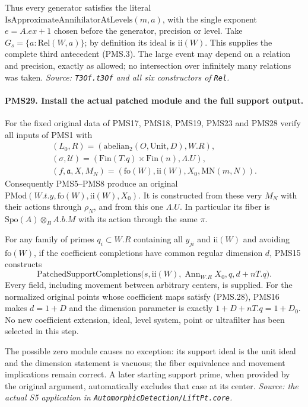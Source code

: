 Thus every generator satisfies the literal
$\mathrm{IsApproximateAnnihilatorAtLevels}(m,a)$, with the
single exponent $e=A.ex+1$ chosen before the generator,
precision or level.  Take $G_s=\{a:\mathrm{Rel}(W,a)\}$;
by definition its ideal is $\mathrm{ii}(W)$.
This supplies the complete third antecedent (PMS.3).
The large event may depend on a relation and precision,
exactly as allowed; no intersection over infinitely many
relations was taken.
\hfill\textit{Source: \texttt{T3Of.t3Of} and all six constructors
of \texttt{Rel}.}

\paragraph{PMS29. Install the actual patched module and the full support output.}
\label{claim:PMS29}
For the fixed original data of PMS17, PMS18, PMS19, PMS23 and
PMS28 verify all inputs of PMS1 with
\[
 \begin{gathered}
 (L_0,R)=(\mathrm{abelian}_2(O,\mathrm{Unit},D),W.R),\\
 (\sigma,\mathscr U)
   =(\mathrm{Fin}(T.q)\times\mathrm{Fin}(n),\Lambda.U),\\
 (f,\mathfrak a,X,M_N)
   =(\mathrm{fo}(W),\mathrm{ii}(W),X_0,\mathrm{MN}(m,N)).
 \end{gathered}
                                                        \tag{PMS.45}
\]
Consequently PMS5--PMS8 produce an original
$\mathrm{PMod}(W.t.y,\mathrm{fo}(W),\mathrm{ii}(W),X_0)$.
It is constructed from these very $M_N$ with their actions
through $\rho_N$, and from this one $\Lambda.U$.
In particular its fiber is $\mathrm{Spo}(A)\otimes_B A.b.M$
with its action through the same $\pi$.

For any family of primes $q_i\subset W.R$ containing all
$y_{ji}$ and $\mathrm{ii}(W)$ and avoiding $\mathrm{fo}(W)$,
if the coefficient completions have common regular dimension
$d$, PMS15 constructs
\[
 \mathrm{PatchedSupportCompletions}
   \bigl(s,\mathrm{ii}(W),\operatorname{Ann}_{W.R}X_0,
          q,d+nT.q\bigr).                        \tag{PMS.46}
\]
Every field, including movement between arbitrary centers,
is supplied.  For the normalized original points whose
coefficient maps satisfy (PMS.28), PMS16 makes
$d=1+D$ and the dimension parameter is exactly
$1+D+nT.q=1+D_0$.
No new coefficient extension, ideal, level system, point or
ultrafilter has been selected in this step.

The possible zero module causes no exception: its support
ideal is the unit ideal and the dimension statement is
vacuous; the fiber equivalence and movement implications
remain correct.  A later starting support prime, when
provided by the original argument, automatically excludes
that case at its center.
\hfill\textit{Source: the actual S5 application in
\texttt{AutomorphicDetection/LiftPt.core}.}

